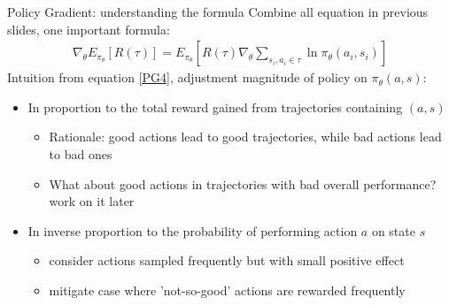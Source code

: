 \begin{frame}{Policy Gradient: understanding the formula}
    Combine all equation in previous slides, one important formula:
        \begin{equation}
            \label{PG4}
            \begin{split}
                \nabla_\theta E_{\pi_{\theta}}[R(\tau)] = E_{\pi_{\theta}}[R(\tau)\nabla_\theta\sum\limits_{s_i,a_i \in \tau}\ln\pi_\theta(a_i,s_i)]
            \end{split}
        \end{equation}
    Intuition from equation \ref{PG4}, adjustment magnitude of policy on $\pi_{\theta}(a,s)$:\vspace{0.2cm}
    \begin{itemize}
        \item In proportion to the total reward gained from trajectories containing $(a,s)$\vspace{0.2cm}
        \begin{itemize}
            \item Rationale: good actions lead to good trajectories, while bad actions lead to bad ones\vspace{0.2cm}
            \item What about good actions in trajectories with bad overall performance? work on it later\vspace{0.2cm}
        \end{itemize}\vspace{0.2cm}
        \item In inverse proportion to the probability of performing action $a$ on state $s$\vspace{0.2cm}
        \begin{itemize}
            \item consider actions sampled frequently but with small positive effect\vspace{0.2cm}
            \item mitigate case where 'not-so-good' actions are rewarded frequently\vspace{0.2cm}
        \end{itemize}
    \end{itemize}
\end{frame}

\iffalse
\begin{frame}{Vanilla Policy Gradient: \textbf{REINFORCE}}
    So far, we obtain the first policy gradient algotithm called \href{http://www-anw.cs.umass.edu/~barto/courses/cs687/williams92simple.pdf}{\textbf{REINFORCE}} \textcolor{CUHKgreen}{\footnotesize[Williams, R. J.]}
    \begin{center}\texttt{[image: REINFORCE]}\end{center}
\end{frame}
\fi

